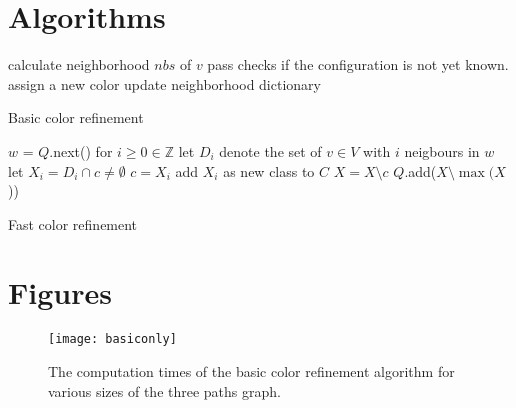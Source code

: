 \documentclass[twoside]{article}
\begin{document}
\begin{appendices}
\label{app}

\section{Algorithms}
\label{app:algs}
\begin{algorithm}
    \begin{algorithmic}[1] %
             
            	 	\State calculate neighborhood $nbs$ of $v$
    \State pass
    				\Else
    						\State checks if the configuration is not yet known.
    					\EndFor
    						\State assign a new color
    					\EndIf
    				\EndIf
            	  \EndFor
					\State update neighborhood dictionary
				\EndFor
            \EndWhile
        \EndProcedure {}
    \end{algorithmic}
    \caption{Basic color refinement}
    \label{alg:basic}
\end{algorithm}

\begin{algorithm}
    \begin{algorithmic}[1]
    			\State $w$ = $Q$.next()
    			\State for $i \geq 0 \in \mathbb{Z}$ let $D_i$ denote the set of $v \in V$ with $i$ neigbours in $w$ 
    				\State let $X_i = D_i \cap c \neq \emptyset$
    						\State $c = X_i$
    					\Else
    						\State add $X_i$ as new class to $C$
    					\EndIf    					
    				\EndFor
    				\State $X = X \setminus c$
    			\EndIf
    			\State $Q$.add($X \setminus \max (X$))
    			\EndFor 			
    			
    		\EndWhile 
        \EndProcedure
    \end{algorithmic}
    \caption{Fast color refinement}
    \label{alg:fast}
\end{algorithm}

\newpage
\section{Figures}
\label{app:figs}
\begin{multicols}{2}
\begin{figure}[H]
	\texttt{[image: basiconly]}
	\caption{The computation times of the basic color refinement algorithm for various sizes of the three paths graph.}
	\label{fig:basiconly}
\end{figure}


\end{multicols}
\end{appendices}
\end{document}
